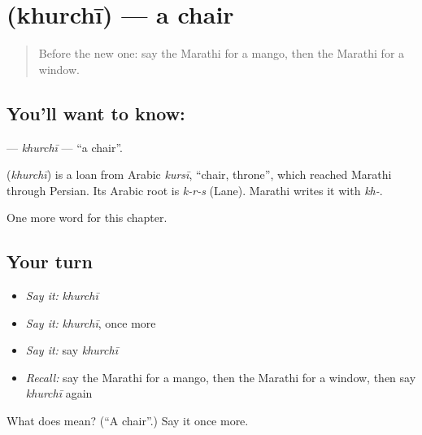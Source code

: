 \section[\texorpdfstring{\mr{खुर्ची} (khurchī)}{खुर्ची (khurchī)}]{ (khurchī) — a chair}

\label{lesson:MR-C89-khurchi}



\begin{quote}
Before the new one: say the Marathi for a mango, then the Marathi for a window.
\end{quote}

\subsection*{You'll want to know: }
\textbf{} — \emph{khurchī} — \textquotedblleft{}a chair\textquotedblright{}.

\begin{cousinweb}
\textbf{} (\emph{khurchī}) is a loan from Arabic \emph{kursī}, \textquotedblleft{}chair, throne\textquotedblright{}, which reached Marathi through Persian. Its Arabic root is \emph{k-r-s} (Lane). Marathi writes it with \emph{kh-}.
\end{cousinweb}

\begin{grammarlens}[title={What you've built}]
One more word for this chapter.
\end{grammarlens}

\subsection*{Your turn}
\begin{itemize}
\raggedright
  \item \emph{Say it:} \emph{khurchī}
  \item \emph{Say it:} \emph{khurchī}, once more
  \item \emph{Say it:} say \emph{khurchī}
  \item \emph{Recall:} say the Marathi for a mango, then the Marathi for a window, then say \emph{khurchī} again
\end{itemize}

\begin{tcolorbox}[breakable,colback=teal!4,colframe=teal!35!black,title={Before you move on}]
What does  mean? (\textquotedblleft{}A chair\textquotedblright{}.) Say it once more.
\end{tcolorbox}
